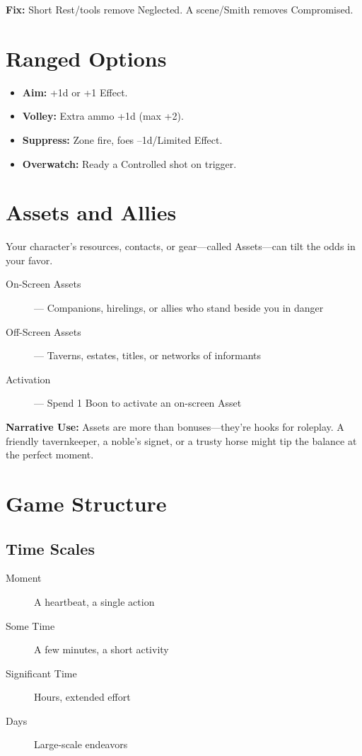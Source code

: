\documentclass[11pt,twoside,openany]{book}
\begin{document}
\textbf{Fix:} Short Rest/tools remove Neglected. A scene/Smith removes Compromised.

\section*{Ranged Options} 

\begin{itemize}
\item \textbf{Aim:} +1d or +1 Effect.
\item \textbf{Volley:} Extra ammo +1d (max +2).
\item \textbf{Suppress:} Zone fire, foes --1d/Limited Effect.
\item \textbf{Overwatch:} Ready a Controlled shot on trigger.
\end{itemize}

\section*{Assets and Allies} 

Your character's resources, contacts, or gear---called Assets---can tilt the odds in your favor.

\begin{description}
\item[On-Screen Assets] --- Companions, hirelings, or allies who stand beside you in danger
\item[Off-Screen Assets] --- Taverns, estates, titles, or networks of informants
\item[Activation] --- Spend 1 Boon to activate an on-screen Asset
\end{description}

\textbf{Narrative Use:} Assets are more than bonuses---they're hooks for roleplay. A friendly tavernkeeper, a noble's signet, or a trusty horse might tip the balance at the perfect moment.

\section*{Game Structure} 

\subsection*{Time Scales}

\begin{description}
\item[Moment] A heartbeat, a single action
\item[Some Time] A few minutes, a short activity
\item[Significant Time] Hours, extended effort
\item[Days] Large-scale endeavors
\end{description}
\end{document}

